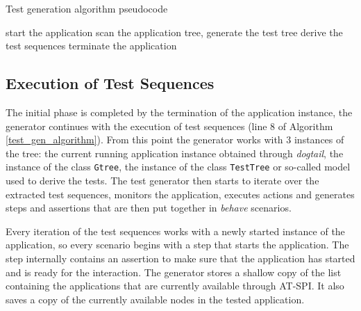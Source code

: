 \begin{center}
\begin{algorithm}[H]
\caption{Test generation algorithm pseudocode}
\label{test_gen_algorithm}
\SetAlgoLined
{}
 start the application\;
 scan the application tree, generate the test tree\;
 derive the test sequences\;
 terminate the application\;
\end{algorithm}
\end{center}

\subsection{Execution of Test Sequences}
The initial phase is completed by the termination of the application instance, the generator continues with the execution of test sequences (line 8 of Algorithm \ref{test_gen_algorithm}). From this point the generator works with 3 instances of the tree: the current running application instance obtained through \textit{dogtail}, the instance of the class \texttt{Gtree}, the instance of the class \texttt{TestTree} or so-called model used to derive the tests.
The test generator then starts to iterate over the extracted test sequences, monitors the application, executes actions and generates steps and assertions that are then put together in \textit{behave} scenarios. 

Every iteration of the test sequences works with a newly started instance of the application, so every scenario begins with a step that starts the application. The step internally contains an assertion to make sure that the application has started and is ready for the interaction. The generator stores a shallow copy of the list containing the applications that are currently available through AT-SPI. It also saves a copy of the currently available nodes in the tested application. 

